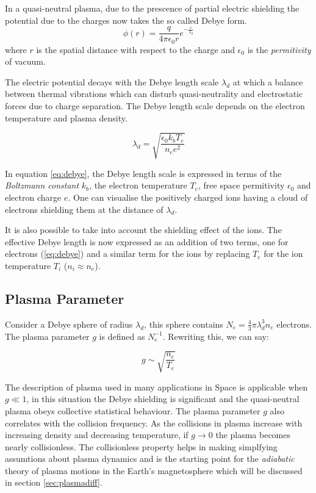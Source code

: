 In a quasi-neutral plasma, due to the prescence of partial electric shielding the potential due to the charges
now takes the so called Debye form.
\begin{equation}
    \phi(r) = \frac{q}{4\pi\epsilon_0 r} e^{-\frac{r}{\lambda_d}}
\end{equation}
where $r$ is the spatial distance with respect to the charge and $\epsilon_0$ is the \emph{permitivity} of vacuum.


The electric potential decays with the Debye length scale $\lambda_d$ at which a balance between thermal vibrations 
which can disturb quasi-neutrality and electrostatic forces due to charge separation. The Debye length scale depends
on the electron temperature and plasma density.

\begin{equation}\label{eq:debye}
    \lambda_d = \sqrt{\frac{\epsilon_0 k_b T_e}{n_e e^2}}
\end{equation}

In equation \ref{eq:debye}, the Debye length scale is expressed in terms of the \emph{Boltzmann constant} $k_b$, 
the electron temperature $T_e$, free space permitivity $\epsilon_0$ and electron charge $e$. One can visualise the 
positively charged ions having a cloud of electrons shielding them at the distance of $\lambda_d$. 

It is also possible to take into account the shielding effect of the ions. The effective Debye length is now 
expressed as an addition of two terms, one for electrons (\ref{eq:debye}) and a similar term for the ions by replacing 
$T_e$ for the ion temperature $T_i$ ($n_i \approx n_e$). 

\subsection*{Plasma Parameter}

Consider a Debye sphere of radius $\lambda_d$, this sphere contains $N_e = \frac{4}{3}\pi \lambda^3_d n_e$ electrons. 
The plasma parameter $g$ is defined as $N_{e}^{-1}$. Rewriting this, we can say:

\begin{equation}
    g \sim \sqrt{\frac{n_e}{T_e}}
\end{equation}

The description of plasma used in many applications in Space is applicable when $g \ll 1$, in this situation 
the Debye shielding is significant and the quasi-neutral plasma obeys collective statistical behaviour. 
The plasma parameter $g$ also correlates with the collision frequency. As the collisions in plasma increase 
with increasing density and decreasing temperature, if $g \longrightarrow 0$ the plasma becomes nearly collisionless. 
The collisionless property helps in making simplfying assumtions about plasma dynamics and is the starting point 
for the \emph{adiabatic} theory of plasma motions in the Earth's magnetosphere which will be discussed in section 
\ref{sec:plasmadiff}.

